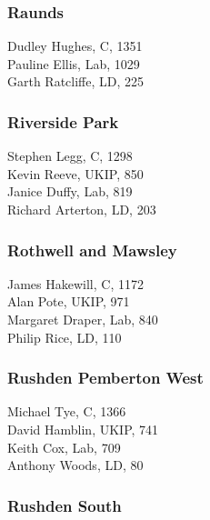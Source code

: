 \documentclass[a4paper,openany,10pt]{book}
\begin{document}
\subsubsection*{Raunds}



Dudley Hughes, C, 1351\\
Pauline Ellis, Lab, 1029\\
Garth Ratcliffe, LD, 225\\


\subsubsection*{Riverside Park}



Stephen Legg, C, 1298\\
Kevin Reeve, UKIP, 850\\
Janice Duffy, Lab, 819\\
Richard Arterton, LD, 203\\


\subsubsection*{Rothwell and Mawsley}



James Hakewill, C, 1172\\
Alan Pote, UKIP, 971\\
Margaret Draper, Lab, 840\\
Philip Rice, LD, 110\\


\subsubsection*{Rushden Pemberton West}



Michael Tye, C, 1366\\
David Hamblin, UKIP, 741\\
Keith Cox, Lab, 709\\
Anthony Woods, LD, 80\\


\subsubsection*{Rushden South}
\end{document}
